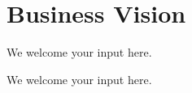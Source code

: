 \section{Business Vision}\label{sec:ekgmm-a-1-1}

We welcome your input here.

\ekgmmContextSection

We welcome your input here.
